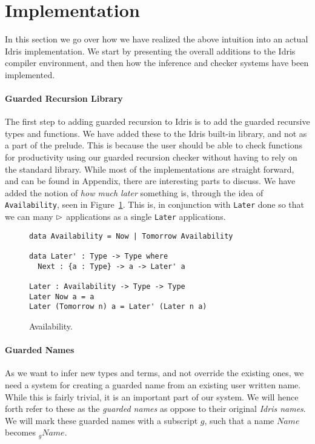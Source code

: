 \section{Implementation}
In this section we go over how we have realized the above intuition into an
actual Idris implementation. We start by presenting the overall additions to the
Idris compiler environment, and then how the inference and checker systems have
been implemented.

\paragraph{Guarded Recursion Library}
The first step to adding guarded recursion to Idris is to add the guarded
recursive types and functions. We have added these to the Idris built-in
library, and not as a part of the prelude. This is because the user should be
able to check functions for productivity using our guarded recursion checker
without having to rely on the standard library.  While most of the
implementations are straight forward, and can be found in Appendix, there are interesting parts to discuss. We
have added the notion of \emph{how much later} something is, through the idea of
\texttt{Availability}, seen in Figure~\ref{fig:availability}. This is, in
conjunction with \texttt{Later} done so that we can many $\rhd$ applications
as a single \texttt{Later} applications.

\begin{figure}[h]
  \begin{lstlisting}[mathescape]
data Availability = Now | Tomorrow Availability

data Later' : Type -> Type where
  Next : {a : Type} -> a -> Later' a

Later : Availability -> Type -> Type
Later Now a = a
Later (Tomorrow n) a = Later' (Later n a)
\end{lstlisting}
  \caption{Availability.}
  \label{fig:availability}
\end{figure}

\paragraph{Guarded Names}
As we want to infer new types and terms, and not override the existing ones, we
need a system for creating a guarded name from an existing user written
name. While this is fairly trivial, it is an important part of our system. We
will hence forth refer to these as the \emph{guarded names} as oppose to their
original \emph{Idris names}. We will mark these guarded names with a subscript
$g$, such that a name $Name$ becomes $_gName$.


